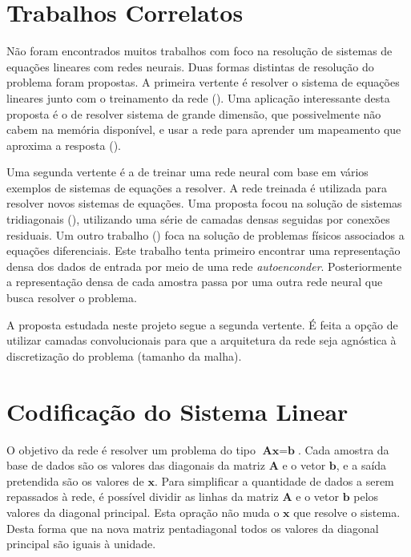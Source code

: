 \documentclass[final,5p]{elsarticle}
\numberwithin{equation}{section}
\begin{document}
\section{Trabalhos Correlatos}

    Não foram encontrados muitos trabalhos com foco na resolução de sistemas de equações lineares com redes neurais. Duas formas distintas de resolução do problema foram propostas. A primeira vertente é resolver o sistema de equações lineares junto com o treinamento da rede (\cite{cichocki1992neural}). Uma aplicação interessante desta proposta é o de resolver sistema de grande dimensão, que possivelmente não cabem na memória disponível, e usar a rede para aprender um mapeamento que aproxima a resposta (\cite{gu2023deep}).

    Uma segunda vertente é a de treinar uma rede neural com base em vários exemplos de sistemas de equações a resolver. A rede treinada é utilizada para resolver novos sistemas de equações. Uma proposta focou na solução de sistemas tridiagonais (\cite{jiang2023neural}), utilizando uma série de camadas densas seguidas por conexões residuais. Um outro trabalho (\cite{kontolati2024learning}) foca na solução de problemas físicos associados a equações diferenciais. Este trabalho tenta primeiro encontrar uma representação densa dos dados de entrada por meio de uma rede \emph{autoenconder}. Posteriormente a representação densa de cada amostra passa por uma outra rede neural que busca resolver o problema.

    A proposta estudada neste projeto segue a segunda vertente. É feita a opção de utilizar camadas convolucionais para que a arquitetura da rede seja agnóstica à discretização do problema (tamanho da malha).

\section{Codificação do Sistema Linear}

    O objetivo da rede é resolver um problema do tipo $\textbf{Ax}=\textbf{b}$. Cada amostra da base de dados são os valores das diagonais da matriz $\textbf{A}$ e o vetor $\textbf{b}$, e a saída pretendida são os valores de $\textbf{x}$. Para simplificar a quantidade de dados a serem repassados à rede, é possível dividir as linhas da matriz $\textbf{A}$ e o vetor $\textbf{b}$ pelos valores da diagonal principal. Esta opração não muda o $\textbf{x}$ que resolve o sistema. Desta forma que na nova matriz pentadiagonal todos os valores da diagonal principal são iguais à unidade.
\end{document}
